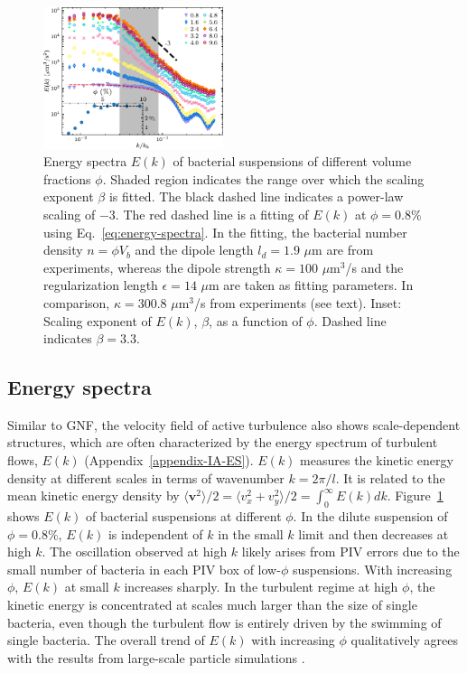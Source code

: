 \documentclass[twocolumn,aps,prx,amsmath,amssymb,longbibliography,superscriptaddress]{revtex4-2}
\begin{document}
\begin{figure}[t]
\begin{center}\includegraphics[width=0.47\textwidth]{Figures/fig-4.pdf}
\caption[Concentration dependence of energy spectra.]
{
Energy spectra $E(k)$ of bacterial suspensions of different volume fractions $\phi$. Shaded region indicates the range over which the scaling exponent $\beta$ is fitted. The black dashed line indicates a power-law scaling of $-3$. The red dashed line is a fitting of $E(k)$ at $\phi=0.8\%$ using Eq.~\ref{eq:energy-spectra}. In the fitting, the bacterial number density $n=\phi V_b$ and the dipole length $l_d = 1.9$ $\mu$m are from experiments, whereas the dipole strength $\kappa = 100$ $\mu$m$^3$/s and the regularization length $\epsilon = 14$ $\mu$m are taken as fitting parameters. In comparison, $\kappa = 300.8$ $\mu$m$^3$/s from experiments (see text).
Inset: Scaling exponent of $E(k)$, $\beta$, as a function of $\phi$. Dashed line indicates $\beta = 3.3$.
}
\label{fig:energy-spectra}
\end{center}
\end{figure}

\subsection{Energy spectra}

Similar to GNF, the velocity field of active turbulence also shows scale-dependent structures, which are often characterized by the energy spectrum of turbulent flows, $E(k)$ (Appendix~\ref{appendix-IA-ES}). $E(k)$ measures the kinetic energy density at different scales in terms of wavenumber $k = 2\pi/l$. It is related to the mean kinetic energy density by $\langle \bm{v}^2 \rangle/2 = \langle v_x^2 + v_y^2 \rangle/2 = \int_0^\infty E(k)dk$. Figure~\ref{fig:energy-spectra} shows $E(k)$ of bacterial suspensions at different $\phi$. In the dilute suspension of $\phi = 0.8 \%$, $E(k)$ is independent of $k$ in the small $k$ limit and then decreases at high $k$. The oscillation observed at high $k$ likely arises from PIV errors due to the small number of bacteria in each PIV box of low-$\phi$ suspensions. With increasing $\phi$, $E(k)$ at small $k$ increases sharply. In the turbulent regime at high $\phi$, the kinetic energy is concentrated at scales much larger than the size of single bacteria, even though the turbulent flow is entirely driven by the swimming of single bacteria. The overall trend of $E(k)$ with increasing $\phi$ qualitatively agrees with the results from large-scale particle simulations \cite{Saintillan2012,Bardfalvy2019}.
\end{document}
